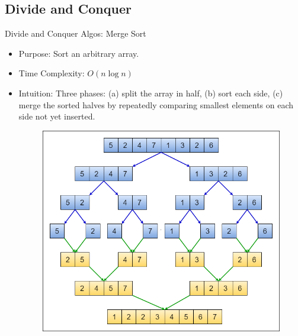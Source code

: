 \documentclass{beamer}
\begin{document}
\subsection{Divide and Conquer}
\begin{frame}[t]{Divide and Conquer Algos: Merge Sort}
    \begin{itemize}
        \item \alert{Purpose:} Sort an arbitrary array.
        \item \alert{Time Complexity}: $O(n \log n)$
        \item \alert{Intuition:} Three phases: (a) split the array in half, (b) sort each side, (c) merge the sorted halves by repeatedly comparing smallest elements on each side not yet inserted.
        \begin{figure}
            \centering
            \includegraphics[width=0.5\linewidth]{mergesort.png}
        \end{figure}
    \end{itemize}
\end{frame}
\end{document}
